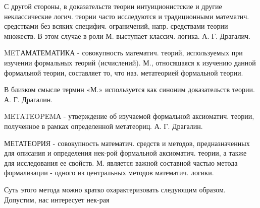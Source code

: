\documentclass[10pt]{article}
\begin{document}
С другой стороны, в доказательств теории интуиционистские и другие неклассические логич. теории часто исследуются и традиционными математич. средствами без всяких специфич. ограничений, напр. средствами теории множеств. В этом случае в роли М. выступает классич. логика. А. Г. Драгалич.



METАМАТЕМАТИКА - совокупность математич. теорий, используемых при изучении формальных теорий (исчислений). М., относящаяся к изучению данной формальной теории, составляет то, что наз. метатеорией формальной теории.



В близком смысле термин «М.» используется как синоним доказательств теории. А. Г. Драгалин.



METATEOPEMА - утверждение об изучаемой формальной аксиоматич. теории, полученное в рамках определенной метатеориц. А. Г. Драгалин.



МЕТАТЕОРИЯ - совокупность математич. средств и методов, предназначенных для описания и определения нек-рой формальной аксиоматич. теории, а также для исследования ее свойств. М. является важной составной частью метода формализации - одного из центральных методов математич. логики.



Суть этого метода можно кратко охарактеризовать следующим образом. Допустим, нас интересует нек-рая
\end{document}
